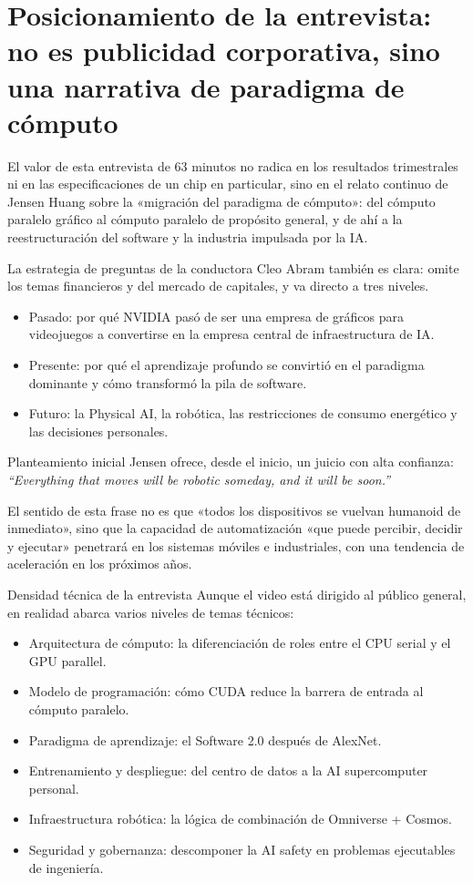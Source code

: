 \section{Posicionamiento de la entrevista: no es publicidad corporativa, sino una narrativa de paradigma de cómputo}

El valor de esta entrevista de 63 minutos no radica en los resultados trimestrales ni en las especificaciones de un chip en particular, sino en el relato continuo de Jensen Huang sobre la «migración del paradigma de cómputo»: del cómputo paralelo gráfico al cómputo paralelo de propósito general, y de ahí a la reestructuración del software y la industria impulsada por la IA.

La estrategia de preguntas de la conductora Cleo Abram también es clara: omite los temas financieros y del mercado de capitales, y va directo a tres niveles.
\begin{itemize}
    \item Pasado: por qué NVIDIA pasó de ser una empresa de gráficos para videojuegos a convertirse en la empresa central de infraestructura de IA.
    \item Presente: por qué el aprendizaje profundo se convirtió en el paradigma dominante y cómo transformó la pila de software.
    \item Futuro: la Physical AI, la robótica, las restricciones de consumo energético y las decisiones personales.
\end{itemize}

\begin{importantbox}{Planteamiento inicial}
Jensen ofrece, desde el inicio, un juicio con alta confianza: \textit{``Everything that moves will be robotic someday, and it will be soon.''}

El sentido de esta frase no es que «todos los dispositivos se vuelvan humanoid de inmediato», sino que la capacidad de automatización «que puede percibir, decidir y ejecutar» penetrará en los sistemas móviles e industriales, con una tendencia de aceleración en los próximos años.
\end{importantbox}

\begin{knowledgebox}{Densidad técnica de la entrevista}
Aunque el video está dirigido al público general, en realidad abarca varios niveles de temas técnicos:
\begin{itemize}
    \item Arquitectura de cómputo: la diferenciación de roles entre el CPU serial y el GPU parallel.
    \item Modelo de programación: cómo CUDA reduce la barrera de entrada al cómputo paralelo.
    \item Paradigma de aprendizaje: el Software 2.0 después de AlexNet.
    \item Entrenamiento y despliegue: del centro de datos a la AI supercomputer personal.
    \item Infraestructura robótica: la lógica de combinación de Omniverse + Cosmos.
    \item Seguridad y gobernanza: descomponer la AI safety en problemas ejecutables de ingeniería.
\end{itemize}
\end{knowledgebox}

